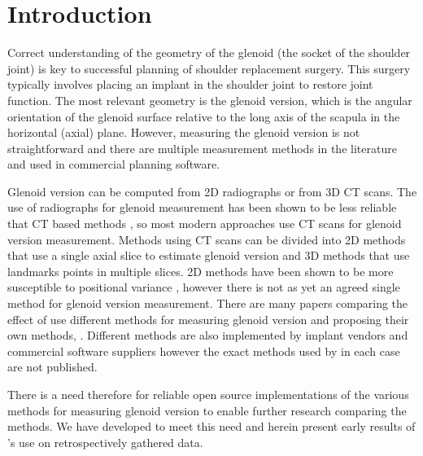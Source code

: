 \section{Introduction}
\label{sec:introduction}
Correct understanding of the geometry of the glenoid (the socket of the shoulder joint) is
key to successful planning of shoulder replacement surgery. This surgery typically involves
placing an implant in the shoulder joint to restore joint function. The most relevant
geometry is the glenoid version, which is the angular orientation of the glenoid surface
relative to the long axis of the scapula in the horizontal (axial) plane. 
However, measuring the glenoid version is not
straightforward and there are multiple measurement methods in the literature and used in
commercial planning software. 

Glenoid version can be computed from {2D} radiographs or from {3D} {CT} scans.
The use of radiographs for glenoid measurement has been shown to be less 
reliable that {CT} based methods \cite{nyffeler2003measurement}, so 
most modern approaches use {CT} scans for glenoid version measurement. 
Methods using {CT} scans can be divided into {2D} methods that 
use a single axial slice to estimate glenoid version and {3D} 
methods that use landmarks points in multiple slices. {2D} methods 
have been shown to be more susceptible to positional variance \cite{bryce2010two}, 
however there is not as yet an agreed single method for glenoid version measurement.
There are many papers comparing the effect of use 
different methods for measuring glenoid version and proposing their own 
methods, \cite{PMID:33330245, PMID:32010231, PMID:29298261, PMID:33554174}. 
Different methods are also implemented by implant vendors and commercial 
software suppliers \cite{blueprint, exactech, djosurgical} however the exact methods
used by in each case are not published. 

There is a need therefore for reliable open source implementations of the various 
methods for measuring glenoid version to enable further research comparing the methods. 
We have developed \sksglenoid to meet this need and herein present early results of \sksglenoidns's 
use on retrospectively gathered data.
